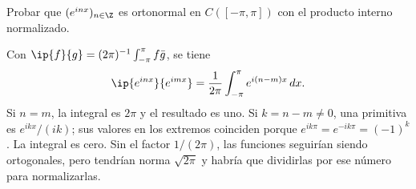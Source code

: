 \begin{ejercicio}\label{ej:lectura-31-3}
Probar que $(e^{inx})_{n\in\Z}$ es ortonormal en $C([-\pi,\pi])$ con el producto interno normalizado.
\end{ejercicio}
\begin{solucion}
Con $\ip{f}{g}=(2\pi)^{-1}\int_{-\pi}^{\pi}f\bar g$, se tiene
\[
 \ip{e^{inx}}{e^{imx}}=\frac1{2\pi}\int_{-\pi}^{\pi}e^{i(n-m)x}\,dx.
\]
Si $n=m$, la integral es $2\pi$ y el resultado es uno. Si $k=n-m\ne0$, una primitiva es $e^{ikx}/(ik)$; sus valores en los extremos coinciden porque $e^{ik\pi}=e^{-ik\pi}=(-1)^k$. La integral es cero. Sin el factor $1/(2\pi)$, las funciones seguirían siendo ortogonales, pero tendrían norma $\sqrt{2\pi}$ y habría que dividirlas por ese número para normalizarlas.
\end{solucion}

